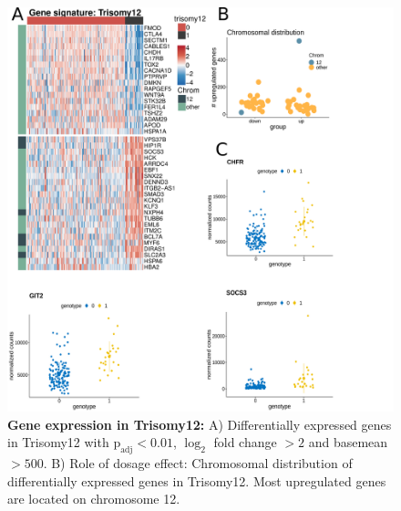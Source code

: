 \begin{figure}
	\centering
	\includegraphics[width=\columnwidth]{figures/trisomy12_chromDist_genes.pdf}
	\caption{\textbf{Gene expression in Trisomy12:} A) Differentially expressed genes in Trisomy12 with $\text{p}_\text{adj} < 0.01$, $\log_2$ fold change $>2$ and basemean $> 500$. B) Role of dosage effect: Chromosomal distribution of differentially expressed genes in Trisomy12. Most upregulated genes are located on chromosome 12.} 
	\label{fig:trisomy12}
\end{figure}

\clearpage


